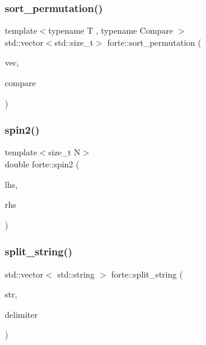 \mbox{\label{namespaceforte_a996bf067eea20bd5fee693835ffb5df1}} 
\subsubsection{\texorpdfstring{sort\+\_\+permutation()}{sort\_permutation()}}
{\footnotesize\ttfamily template$<$typename T , typename Compare $>$ \\
std\+::vector$<$std\+::size\+\_\+t$>$ forte\+::sort\+\_\+permutation (\begin{DoxyParamCaption}\item[{const std\+::vector$<$ T $>$ \&}]{vec,  }\item[{Compare \&}]{compare }\end{DoxyParamCaption})}

\mbox{\label{namespaceforte_ac9198f621cd3197e86a298b0284e3b68}} 
\subsubsection{\texorpdfstring{spin2()}{spin2()}}
{\footnotesize\ttfamily template$<$size\+\_\+t N$>$ \\
double forte\+::spin2 (\begin{DoxyParamCaption}\item[{const \mbox{\hyperlink{classforte_1_1_determinant_impl}{Determinant\+Impl}}$<$ N $>$ \&}]{lhs,  }\item[{const \mbox{\hyperlink{classforte_1_1_determinant_impl}{Determinant\+Impl}}$<$ N $>$ \&}]{rhs }\end{DoxyParamCaption})}

\mbox{\label{namespaceforte_a312df55f4cebf6418d24b7cd4e62f7ef}} 
\subsubsection{\texorpdfstring{split\+\_\+string()}{split\_string()}}
{\footnotesize\ttfamily std\+::vector$<$ std\+::string $>$ forte\+::split\+\_\+string (\begin{DoxyParamCaption}\item[{const std\+::string \&}]{str,  }\item[{const std\+::string \&}]{delimiter }\end{DoxyParamCaption})}

